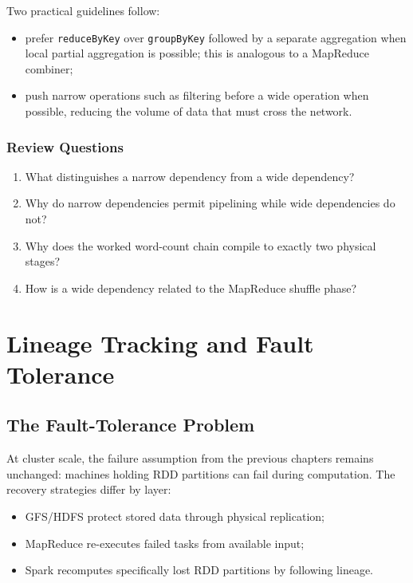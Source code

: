 \documentclass[11pt,a4paper,oneside]{book}
\begin{document}
Two practical guidelines follow:

\begin{itemize}
    \item prefer \texttt{reduceByKey} over \texttt{groupByKey} followed by a separate aggregation when local partial aggregation is possible; this is analogous to a MapReduce combiner;
    \item push narrow operations such as filtering before a wide operation when possible, reducing the volume of data that must cross the network.
\end{itemize}

\subsubsection*{Review Questions}
\begin{enumerate}
    \item What distinguishes a narrow dependency from a wide dependency?
    \item Why do narrow dependencies permit pipelining while wide dependencies do not?
    \item Why does the worked word-count chain compile to exactly two physical stages?
    \item How is a wide dependency related to the MapReduce shuffle phase?
\end{enumerate}

\section{Lineage Tracking and Fault Tolerance}
\label{sec:spark-lineage}

\subsection{The Fault-Tolerance Problem}

At cluster scale, the failure assumption from the previous chapters remains unchanged: machines holding RDD partitions can fail during computation. The recovery strategies differ by layer:

\begin{itemize}
    \item GFS/HDFS protect stored data through physical replication;
    \item MapReduce re-executes failed tasks from available input;
    \item Spark recomputes specifically lost RDD partitions by following lineage.
\end{itemize}
\end{document}
